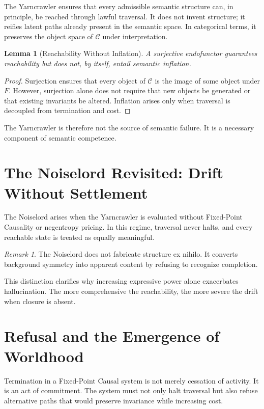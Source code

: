\documentclass[12pt]{article}
\newtheorem{lemma}[theorem]{Lemma}
\theoremstyle{remark}
\newtheorem*{remark}{Remark}
\begin{document}
The Yarncrawler ensures that every admissible semantic structure can, in principle, be reached through lawful traversal. It does not invent structure; it reifies latent paths already present in the semantic space. In categorical terms, it preserves the object space of $\mathcal{C}$ under interpretation.

\begin{lemma}[Reachability Without Inflation]
A surjective endofunctor guarantees reachability but does not, by itself, entail semantic inflation.
\end{lemma}

\begin{proof}
Surjection ensures that every object of $\mathcal{C}$ is the image of some object under $F$. However, surjection alone does not require that new objects be generated or that existing invariants be altered. Inflation arises only when traversal is decoupled from termination and cost.
\end{proof}

The Yarncrawler is therefore not the source of semantic failure. It is a necessary component of semantic competence.

\section{The Noiselord Revisited: Drift Without Settlement}

The Noiselord arises when the Yarncrawler is evaluated without Fixed-Point Causality or negentropy pricing. In this regime, traversal never halts, and every reachable state is treated as equally meaningful.

\begin{remark}
The Noiselord does not fabricate structure ex nihilo. It converts background symmetry into apparent content by refusing to recognize completion.
\end{remark}

This distinction clarifies why increasing expressive power alone exacerbates hallucination. The more comprehensive the reachability, the more severe the drift when closure is absent.

\section{Refusal and the Emergence of Worldhood}

Termination in a Fixed-Point Causal system is not merely cessation of activity. It is an act of commitment. The system must not only halt traversal but also refuse alternative paths that would preserve invariance while increasing cost.
\end{document}
